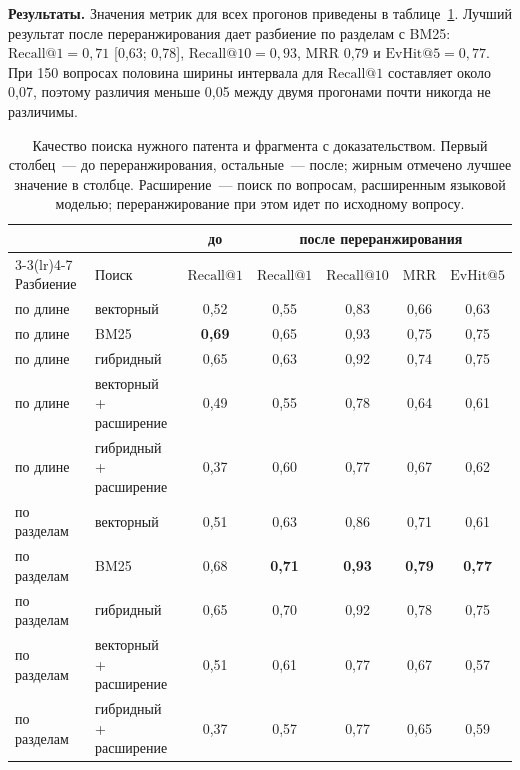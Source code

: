 \documentclass{article}
\makeatletter
\newcommand{\Rk}[1]{\mathrm{Recall@}#1}
\newcommand{\Ek}[1]{\mathrm{EvHit@}#1}
\makeatother
\begin{document}
\textbf{Результаты.} Значения метрик для всех прогонов приведены в таблице~\ref{tab:results}. Лучший результат после переранжирования дает разбиение по разделам с BM25: $\Rk{1} = 0{,}71$ [0,63; 0,78], $\Rk{10} = 0{,}93$, MRR 0,79 и $\Ek{5} = 0{,}77$. При 150 вопросах половина ширины интервала для $\Rk{1}$ составляет около 0,07, поэтому различия меньше 0,05 между двумя прогонами почти никогда не различимы.

\begin{table}[t]
    \centering
    \small
    \caption{Качество поиска нужного патента и фрагмента с доказательством. Первый столбец~--- до переранжирования, остальные~--- после; жирным отмечено лучшее значение в столбце. Расширение~--- поиск по вопросам, расширенным языковой моделью; переранжирование при этом идет по исходному вопросу.}
    \label{tab:results}
    \begin{tabular}{llccccc}
        \toprule
        & & до & \multicolumn{4}{c}{после переранжирования} \\
        \cmidrule(lr){3-3}\cmidrule(lr){4-7}
        Разбиение & Поиск & $\Rk{1}$ & $\Rk{1}$ & $\Rk{10}$ & MRR & $\Ek{5}$ \\
        \midrule
        по длине & векторный & 0,52 & 0,55 & 0,83 & 0,66 & 0,63 \\
        по длине & BM25 & \textbf{0,69} & 0,65 & 0,93 & 0,75 & 0,75 \\
        по длине & гибридный & 0,65 & 0,63 & 0,92 & 0,74 & 0,75 \\
        по длине & векторный + расширение & 0,49 & 0,55 & 0,78 & 0,64 & 0,61 \\
        по длине & гибридный + расширение & 0,37 & 0,60 & 0,77 & 0,67 & 0,62 \\
        \midrule
        по разделам & векторный & 0,51 & 0,63 & 0,86 & 0,71 & 0,61 \\
        по разделам & BM25 & 0,68 & \textbf{0,71} & \textbf{0,93} & \textbf{0,79} & \textbf{0,77} \\
        по разделам & гибридный & 0,65 & 0,70 & 0,92 & 0,78 & 0,75 \\
        по разделам & векторный + расширение & 0,51 & 0,61 & 0,77 & 0,67 & 0,57 \\
        по разделам & гибридный + расширение & 0,37 & 0,57 & 0,77 & 0,65 & 0,59 \\
        \bottomrule
    \end{tabular}
\end{table}
\end{document}
